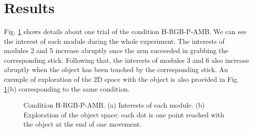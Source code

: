 \documentclass[10pt,letterpaper]{article}
\begin{document}
		
	
%


\section{Results}
	

	\paragraph{}
	Fig. \ref{res_interests} shows details about one trial of the condition H-RGB-P-AMB. 
	We can see the interest of each module during the whole experiment.
	The interests of modules 2 and 5 increase abruptly once the arm succeeded in grabbing the corresponding stick.
	Following that, the interests of modules 3 and 6 also increase abruptly when the object has been touched by the corresponding stick.
	An exemple of exploration of the $2$D space with the object is also provided in Fig. \ref{res_interests}(b) corresponding to the same condition.
	
	\begin{figure}[ht]
		\centering
		\caption{Condition H-RGB-P-AMB. (a) Interests of each module. (b) Exploration of the object space: each dot is one point reached with the object at the end of one movement.}
		\label{res_interests}
	\end{figure}
\end{document}
